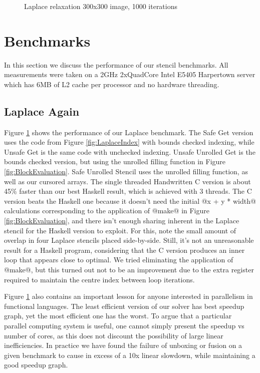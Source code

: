 
\begin{figure}
\vspace{-2.5em}

\vspace{2em}
\caption{Laplace relaxation 300x300 image, 1000 iterations}
\label{fig:LaplaceBenchmarks}
\end{figure}


\section{Benchmarks}

In this section we discuss the performance of our stencil benchmarks. All measurements were taken on a 2GHz 2xQuadCore Intel E5405 Harpertown server which has 6MB of L2 cache per processor and no hardware threading.


\subsection{Laplace Again} 
Figure \ref{fig:LaplaceBenchmarks} shows the performance of our Laplace benchmark. The Safe Get version uses the code from Figure \ref{fig:LaplaceIndex} with bounds checked indexing, while Unsafe Get is the same code with unchecked indexing. Unsafe Unrolled Get is the bounds checked version, but using the unrolled filling function in Figure \ref{fig:BlockEvaluation}. Safe Unrolled Stencil uses the unrolled filling function, as well as our cursored arrays. The single threaded Handwritten C version is about 45\% faster than our best Haskell result, which is achieved with 3 threads. The C version beats the Haskell one because it doesn't need the initial @x + y * width@ calculations corresponding to the application of @make@ in Figure \ref{fig:BlockEvaluation}, and there isn't enough sharing inherent in the Laplace stencil for the Haskell version to exploit. For this, note the small amount of overlap in four Laplace stencils placed side-by-side. Still, it's not an unreasonable result for a Haskell program, considering that the C version produces an inner loop that appears close to optimal. We tried eliminating the application of @make@, but this turned out not to be an improvement due to the extra register required to maintain the centre index between loop iterations. 

Figure \ref{fig:LaplaceBenchmarks} also contains an important lesson for anyone interested in parallelism in functional languages. The least efficient version of our solver has best speedup graph, yet the most efficient one has the worst. To argue that a particular parallel computing system is useful, one cannot simply present the speedup vs number of cores, as this does not discount the possibility of large linear inefficiencies. In practice we have found the failure of unboxing or fusion on a given benchmark to cause in excess of a 10x linear slowdown, while maintaining a good speedup graph. 

